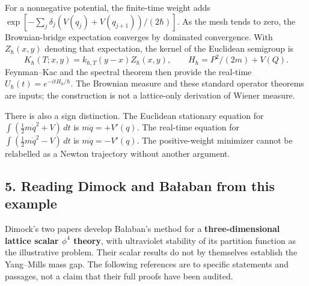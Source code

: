 \documentclass[11pt,a4paper]{article}
\begin{document}
For a nonnegative potential, the finite-time weight adds
\(\exp[-\sum_j \delta_j(V(q_j)+V(q_{j+1}))/(2\hbar)]\). As the mesh
tends to zero, the Brownian-bridge expectation converges by dominated
convergence. With \(Z_\hbar(x,y)\) denoting that expectation, the kernel
of the Euclidean semigroup is
\[K_\hbar(T;x,y)=k_{\hbar,T}(y-x)Z_\hbar(x,y),\qquad
 H_\hbar=P^2/(2m)+V(Q).\tag{11}\] Feynman--Kac and the spectral theorem
then provide the real-time \(U_\hbar(t)=e^{-itH_\hbar/\hbar}\). The
Brownian measure and these standard operator theorems are inputs; the
construction is not a lattice-only derivation of Wiener measure.

There is also a sign distinction. The Euclidean stationary equation for
\(\int(\tfrac12m\dot q^2+V)\,dt\) is \(m\ddot q=+V'(q)\). The real-time
equation for \(\int(\tfrac12m\dot q^2-V)\,dt\) is \(m\ddot q=-V'(q)\).
The positive-weight minimizer cannot be relabelled as a Newton
trajectory without another argument.

\hypertarget{reading-dimock-and-baux142aban-from-this-example}{%
\subsection{5. Reading Dimock and Bałaban from this
example}\label{reading-dimock-and-baux142aban-from-this-example}}

Dimock's two papers develop Bałaban's method for a
\textbf{three-dimensional lattice scalar \(\phi^4\) theory}, with
ultraviolet stability of its partition function as the illustrative
problem. Their scalar results do not by themselves establish the
Yang--Mills mass gap. The following references are to specific
statements and passages, not a claim that their full proofs have been
audited.
\end{document}
